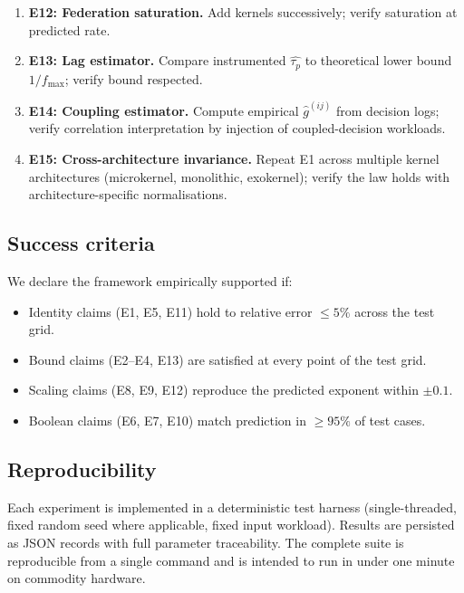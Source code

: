 \documentclass[twocolumn,11pt,a4paper]{article}
\newcommand{\taup}{\tau_p}
\begin{document}
\begin{enumerate}[nosep,leftmargin=*]
\item \textbf{E12: Federation saturation.} Add kernels successively; verify saturation at predicted rate.
\item \textbf{E13: Lag estimator.} Compare instrumented $\hat{\taup}$ to theoretical lower bound $1/f_\mathrm{max}$; verify bound respected.
\item \textbf{E14: Coupling estimator.} Compute empirical $\hat{g}^{(ij)}$ from decision logs; verify correlation interpretation by injection of coupled-decision workloads.
\item \textbf{E15: Cross-architecture invariance.} Repeat E1 across multiple kernel architectures (microkernel, monolithic, exokernel); verify the law holds with architecture-specific normalisations.
\end{enumerate}

\subsection{Success criteria}

We declare the framework empirically supported if:
\begin{itemize}[nosep,leftmargin=*]
\item Identity claims (E1, E5, E11) hold to relative error $\leq 5\%$ across the test grid.
\item Bound claims (E2--E4, E13) are satisfied at every point of the test grid.
\item Scaling claims (E8, E9, E12) reproduce the predicted exponent within $\pm 0.1$.
\item Boolean claims (E6, E7, E10) match prediction in $\geq 95\%$ of test cases.
\end{itemize}

\subsection{Reproducibility}

Each experiment is implemented in a deterministic test harness (single-threaded, fixed random seed where applicable, fixed input workload). Results are persisted as JSON records with full parameter traceability. The complete suite is reproducible from a single command and is intended to run in under one minute on commodity hardware.
\end{document}
